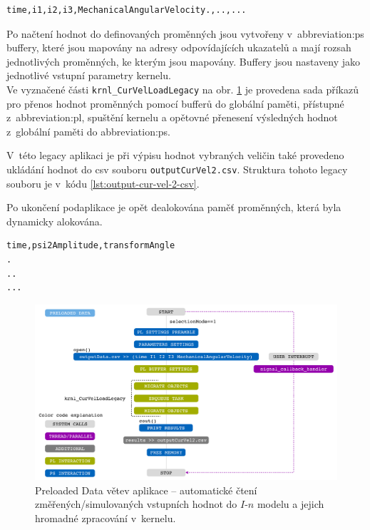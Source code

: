 \documentclass[a4paper, twoside, 11pt]{article}
\begin{document}
	\begin{lstlisting}[language={Text}, caption={Struktura souboru outputData, ze kterého jsou načítány hodnoty pro akcelerovaný kernel.}, label={lst:output-data-csv-struktura}]
time,i1,i2,i3,MechanicalAngularVelocity.,..,...
\end{lstlisting}
	Po načtení hodnot do definovaných proměnných jsou vytvořeny v~\gls{abbreviation:ps} buffery, které jsou mapovány na adresy odpovídajících ukazatelů a mají rozsah jednotlivých proměnných, ke kterým jsou mapovány. Buffery jsou nastaveny jako jednotlivé vstupní parametry kernelu.\\Ve vyznačené části \texttt{krnl\_CurVelLoadLegacy} na obr. \ref{fig:preloaded-data} je provedena sada příkazů pro přenos hodnot proměnných pomocí bufferů do globální paměti, přístupné z~\gls{abbreviation:pl}, spuštění kernelu a opětovné přenesení výsledných hodnot z~globální paměti do \gls{abbreviation:ps}.\par
	V~této legacy aplikaci je při výpisu hodnot vybraných veličin také provedeno ukládání hodnot do csv souboru \texttt{outputCurVel2.csv}. Struktura tohoto legacy souboru je v~kódu \ref{lst:output-cur-vel-2-csv}.\par
	Po ukončení podaplikace je opět dealokována paměť proměnných, která byla dynamicky alokována.

	\begin{lstlisting}[language={Text}, caption={Struktura souboru outputCurVel2.csv, do něhož jsou umisťovány výstupní hodnoty vybraných veličin, vypočtených pomocí akcelerované aplikace.}, label={lst:output-cur-vel-2-csv}]
time,psi2Amplitude,transformAngle
.
..
...\end{lstlisting}



		\begin{figure}[htbp!]
		   \centering
		   \includegraphics[width=1\textwidth]{src/pdf/preloaded-data.pdf}
		   \caption{Preloaded Data větev aplikace – automatické čtení změřených/simulovaných vstupních hodnot do $I$-$n$ modelu a jejich hromadné zpracování v~kernelu.}
		   \label{fig:preloaded-data}
	   \end{figure}
\end{document}
